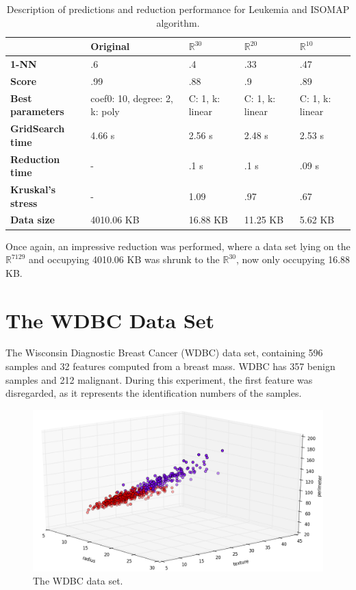 \begin{table}[H]
	\centering
	
	\begin{tabular}{|p{.15\linewidth}|p{.15\linewidth}|p{.15\linewidth}|p{.15\linewidth}|p{.15\linewidth}|}
		\hline
		& \textbf{Original} & $\mathbb{R}^{30}$ & $\mathbb{R}^{20}$ & $\mathbb{R}^{10}$ \\\hline
		\textbf{1-NN} & .6 & .4 & .33 & .47\\\hline
		\textbf{Score} & .99 & .88 & .9 & .89 \\\hline
		\textbf{Best parameters} & coef0: 10, degree: 2, k: poly & C: 1, k: linear & C: 1, k: linear & C: 1, k: linear \\\hline
		\textbf{GridSearch time} & 4.66 s & 2.56 s & 2.48 s & 2.53 s \\\hline
		\textbf{Reduction time} & - & .1 s & .1 s & .09 s \\\hline
		\textbf{Kruskal's stress} & - & 1.09 & .97 & .67 \\\hline
		\textbf{Data size} & 4010.06 KB & 16.88 KB & 11.25 KB & 5.62 KB \\\hline
	\end{tabular}
	\captionsetup{justification=centering}
	\caption{Description of predictions and reduction performance for Leukemia and ISOMAP algorithm.}
\end{table}

Once again, an impressive reduction was performed, where a data set lying on the $\mathbb{R}^{7129}$ and occupying 4010.06 KB was shrunk to the $\mathbb{R}^{30}$, now only occupying 16.88 KB.
\clearpage

\section{The WDBC Data Set}

The Wisconsin Diagnostic Breast Cancer (WDBC) data set, containing 596 samples and 32 features computed from a breast mass. WDBC has 357 benign samples and 212 malignant. During this experiment, the first feature was disregarded, as it represents the identification numbers of the samples.

\begin{figure}[H]
	\centering
	\includegraphics[width=\linewidth]{img/datasets/wdbc}
	\captionsetup{justification=centering}
	\caption{The WDBC data set.}
	\label{fig:dswdbc}
\end{figure}

